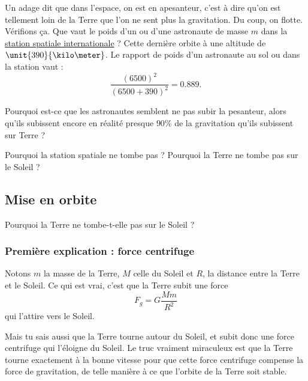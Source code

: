 Un adage dit que dans l'espace, on est en apesanteur, c'est à dire qu'on est tellement loin de la Terre que l'on ne sent plus la gravitation. Du coup, on flotte. Vérifions ça. Que vaut le poids d'un ou d'une astronaute de masse $m$ dans la \href{http://fr.wikipedia.org/wiki/Station_spatiale_internationale}{station spatiale internationale} ? Cette dernière orbite à une altitude de $\unit{390}{\kilo\meter}$. Le rapport de poids d'un astronaute au sol ou dans la station vaut :
\[ 
  \frac{ (6500)^2 }{ (6500+390)^2 }=0.889.
\]

\begin{probleme}
	Pourquoi est-ce que les astronautes semblent ne pas subir la pesanteur, alors qu'ils subissent encore en réalité presque $90\%$ de la gravitation qu'ils subissent sur Terre ?

	Pourquoi la station spatiale ne tombe pas ? Pourquoi la Terre ne tombe pas sur le Soleil ?
\end{probleme}




\subsection{Mise en orbite}
\label{SubSecMiseEnOrbite}
Pourquoi la Terre ne tombe-t-elle pas sur le Soleil ? 

\subsubsection{Première explication : force centrifuge}

Notons $m$ la masse de la Terre, $M$ celle du Soleil et $R$, la distance entre la Terre et le Soleil. Ce qui est vrai, c'est que la Terre subit une force 
\begin{equation}
	F_g=G\frac{ Mm }{ R^2 }
\end{equation}
qui l'attire vers le Soleil.

Mais tu sais aussi que la Terre tourne autour du Soleil, et subit donc une force centrifuge qui l'éloigne du Soleil. Le truc vraiment miraculeux est que la Terre tourne exactement à la bonne vitesse pour que cette force centrifuge compense la force de gravitation, de telle manière à ce que l'orbite de la Terre soit stable.

